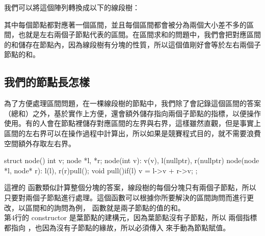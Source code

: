 我們可以將這個陣列轉換成以下的線段樹：\\

\begin{center}

\end{center}

其中每個節點都對應著一個區間，並且每個區間都會被分為兩個大小差不多的區間，也就是左右兩個子節點代表的區間。在區間求和的問題中，我們會把對應區間的和儲存在節點內，因為線段樹有分塊的性質，所以這個值剛好會等於左右兩個子節點的和。\\

\subsection{我們的節點長怎樣}

為了方便處理區間問題，在一棵線段樹的節點中，我們除了會記錄這個區間的答案（總和）之外，基於實作上方便，還會額外儲存指向兩個子節點的指標，以便操作使用。有的人會在節點裡儲存對應區間的左界與右界，這樣雖然直觀，但是事實上區間的左右界可以在操作過程中計算出，所以如果是競賽程式目的，就不需要浪費空間額外存取左右界。\\

\begin{C++}
struct node(){
    int v;
    node *l, *r;
    node(int v): v(v), l(nullptr), r(nullptr){}
    node(node *l, node* r): l(l), r(r){pull();}
    void pull(){if(l) v = l->v + r->v;}
};
\end{C++}

這裡的  函數類似計算整個分塊的答案，線段樹的每個分塊只有兩個子節點，所以只要對兩個子節點進行處理。這個函數可以根據你所要解決的區間詢問而進行更改，以區間和的詢問為例，  函數就是兩子節點的值的和。\\

第$4$行的 constructor 是葉節點的建構元，因為葉節點沒有子節點，所以  兩個指標都指向 ，也因為沒有子節點的緣故，所以必須傳入  來手動為節點賦值。\\

